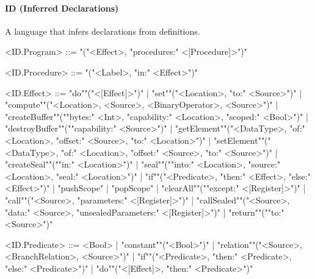 \documentclass[main.tex]{subfiles}
\begin{document}
\paragraph{ ID (Inferred Declarations) } A language that infers declarations from definitions.
\begin{grammar}
	\footnotesize
				<ID.Program> ::=
							"("<Effect>, "procedures:" <[Procedure]>")"
				\par
				<ID.Procedure> ::=
							"("<Label>, "in:" <Effect>")"
				\par
				<ID.Effect> ::=
						"do""("<[Effect]>")"
						| "set""("<Location>, "to:" <Source>")"
						| "compute""("<Location>, <Source>, <BinaryOperator>, <Source>")"
						| "createBuffer""(""bytes:" <Int>, "capability:" <Location>, "scoped:" <Bool>")"
						| "destroyBuffer""(""capability:" <Source>")"
						| "getElement""("<DataType>, "of:" <Location>, "offset:" <Source>, "to:" <Location>")"
						| "setElement""("<DataType>, "of:" <Location>, "offset:" <Source>, "to:" <Source>")"
						| "createSeal""(""in:" <Location>")"
						| "seal""(""into:" <Location>, "source:" <Location>, "seal:" <Location>")"
						| "if""("<Predicate>, "then:" <Effect>, "else:" <Effect>")"
						| "pushScope"
						| "popScope"
						| "clearAll""(""except:" <[Register]>")"
						| "call""("<Source>, "parameters:" <[Register]>")"
						| "callSealed""("<Source>, "data:" <Source>, "unsealedParameters:" <[Register]>")"
						| "return""(""to:" <Source>")"
				\par
				<ID.Predicate> ::=
						<Bool> |
						"constant""("<Bool>")"
						| "relation""("<Source>, <BranchRelation>, <Source>")"
						| "if""("<Predicate>, "then:" <Predicate>, "else:" <Predicate>")"
						| "do""("<[Effect]>, "then:" <Predicate>")"
				\par
\end{grammar}
\par
\end{document}

